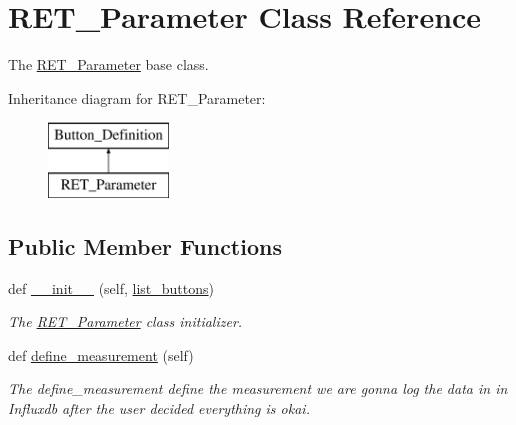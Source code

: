 \hypertarget{a00037}{}\section{R\+E\+T\+\_\+\+Parameter Class Reference}
\label{a00037}


The \hyperlink{a00037}{R\+E\+T\+\_\+\+Parameter} base class.  


Inheritance diagram for R\+E\+T\+\_\+\+Parameter\+:\begin{figure}[H]
\begin{center}
\leavevmode
\includegraphics[height=2.000000cm]{a00037}
\end{center}
\end{figure}
\subsection*{Public Member Functions}
\begin{DoxyCompactItemize}
\item 
def \hyperlink{a00037_ae2ab6faaa5ceb4d95a632635b03d437d}{\+\_\+\+\_\+init\+\_\+\+\_\+} (self, \hyperlink{a00037_a50ea04db981a8afa82086a60a58ae466}{list\+\_\+buttons})
\begin{DoxyCompactList}\small\item\em The \hyperlink{a00037}{R\+E\+T\+\_\+\+Parameter} class initializer. \end{DoxyCompactList}\item 
def \hyperlink{a00037_af5c20d36ffa1a792d1aab7bcce87bf4b}{define\+\_\+measurement} (self)
\begin{DoxyCompactList}\small\item\em The define\+\_\+measurement define the measurement we are gonna log the data in in Influxdb after the user decided everything is okai. \end{DoxyCompactList}\end{DoxyCompactItemize}
